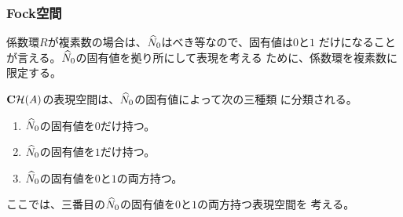 {\subsubsection{Fock空間}\label{s3:Fock空間} %
	係数環$R$が複素数の場合は、$\widehat{N}_0$はべき等なので、固有値は$0$と$1$
	だけになることが言える。$\widehat{N}_0$の固有値を拠り所にして表現を考える
	ために、係数環を複素数に限定する。

	$\mathbf{C}{{\mathcal{H}}}(A)$の表現空間は、$\widehat{N}_0$の固有値によって次の三種類
	に分類される。
	\begin{enumerate}\setlength{\itemsep}{-1mm} %
		\item $\widehat{N}_0$の固有値を$0$だけ持つ。
		\item $\widehat{N}_0$の固有値を$1$だけ持つ。
		\item $\widehat{N}_0$の固有値を$0$と$1$の両方持つ。
	\end{enumerate} %
	ここでは、三番目の$\widehat{N}_0$の固有値を$0$と$1$の両方持つ表現空間を
	考える。

}
